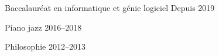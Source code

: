 

\begin{cventries}

  {Baccalauréat en informatique et génie logiciel} %
  {} %
  {Depuis 2019} %
  {
  }

  {Piano jazz} %
  {} %
  {2016--2018} %
  {
  }

  {Philosophie} %
  {} %
  {2012--2013} %
  {
  }
\end{cventries}
